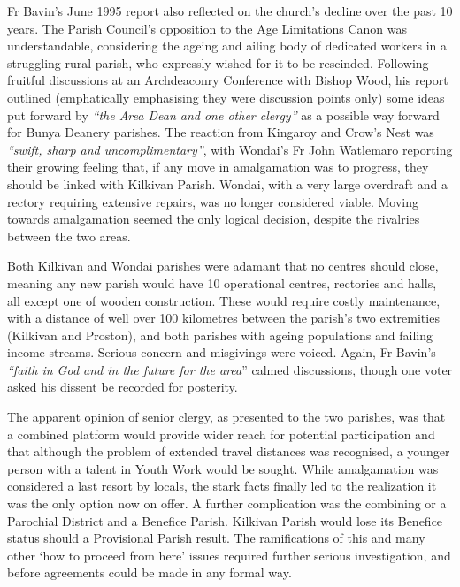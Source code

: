 Fr Bavin's June 1995 report also reflected on the church's decline over the past 10 years. The Parish Council's opposition to the Age Limitations Canon was understandable, considering the ageing and ailing body of dedicated workers in a struggling rural parish, who expressly wished for it to be rescinded. Following fruitful discussions at an Archdeaconry Conference with Bishop Wood, his report outlined (emphatically emphasising they were discussion points only) some ideas put forward by \emph{``the Area Dean and one other clergy''} as a possible way forward for Bunya Deanery parishes. The reaction from Kingaroy and Crow's Nest was \emph{``swift, sharp and uncomplimentary''}, with Wondai's Fr John Watlemaro reporting their growing feeling that, if any move in amalgamation was to progress, they should be linked with Kilkivan Parish. Wondai, with a very large overdraft and a rectory requiring extensive repairs, was no longer considered viable. Moving towards amalgamation seemed the only logical decision, despite the rivalries between the two areas.



Both Kilkivan and Wondai parishes were adamant that no centres should close, meaning any new parish would have 10 operational centres, rectories and halls, all except one of wooden construction. These would require costly maintenance, with a distance of well over 100 kilometres between the parish's two extremities (Kilkivan and Proston), and both parishes with ageing populations and failing income streams. Serious concern and misgivings were voiced. Again, Fr Bavin's \emph{``faith in God and in the future for the area}'' calmed discussions, though one voter asked his dissent be recorded for posterity.



The apparent opinion of senior clergy, as presented to the two parishes, was that a combined platform would provide wider reach for potential participation and that although the problem of extended travel distances was recognised, a younger person with a talent in Youth Work would be sought. While amalgamation was considered a last resort by locals, the stark facts finally led to the realization it was the only option now on offer. A further complication was the combining or a Parochial District and a Benefice Parish. Kilkivan Parish would lose its Benefice status should a Provisional Parish result. The ramifications of this and many other `how to proceed from here' issues required further serious investigation, and before agreements could be made in any formal way.




